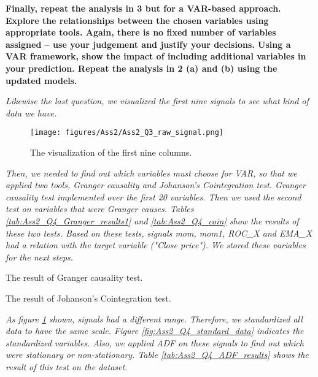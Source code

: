 \item \textbf{Finally, repeat the analysis in 3 but for a VAR-based approach. Explore the relationships between the chosen variables using appropriate tools. Again, there is no fixed number of variables assigned – use your judgement and justify your decisions.  Using a VAR framework, show the impact of including additional variables in your prediction. Repeat the analysis in 2 (a) and (b) using the updated models.} 

\textit{Likewise the last question, we visualized the first nine signals to see what kind of data we have.} 

\begin{figure}[H]
    \centering
    \begin{minipage}[b]{1\textwidth}
        \texttt{[image: figures/Ass2/Ass2\_Q3\_raw\_signal.png]}
    \end{minipage}
    \caption{The visualization of the first nine columns.}
    \label{fig:Ass2_Q4_raw_signal}
\end{figure}


\textit{Then, we needed to find out which variables must choose for VAR, so that we applied two tools, Granger causality and Johanson's Cointegration test. Granger causality test implemented over the first 20 variables. Then we used the second test on variables that were Granger causes. Tables \ref{tab:Ass2_Q4_Granger_results1} and \ref{tab:Ass2_Q4_coin} show the results of these two tests.
Based on these tests, signals mom, mom1, ROC\_X and EMA\_X had a relation with the target variable ("Close price"). We stored these variables for the next steps.}

\begin{table}[H]
\centering
\caption{The result of Granger causality test.}
\label{tab:Ass2_Q4_Granger_results1}

\end{table}


\begin{table}[H]
\centering
\caption{The result of Johanson's Cointegration test.}
\label{tab:Ass2_Q4_coin}

\end{table}


\textit{As figure \ref{fig:Ass2_Q4_raw_signal} shown, signals had a different range. Therefore, we standardized all data to have the same scale. Figure \ref{fig:Ass2_Q4_standard_data} indicates the standardized variables. Also, we applied \gls{ADF} on these signals to find out which were stationary or non-stationary. Table \ref{tab:Ass2_Q4_ADF_results} shows the result of this test on the dataset.}

